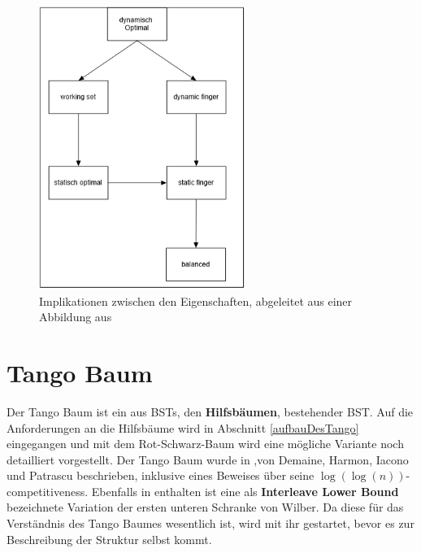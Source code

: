 \documentclass[a4paper,12pt]{article}
\begin{document}
\begin{figure}[h]
	\centering
	\includegraphics[width= 0.6\textwidth]{"Medien/DynOpt/upperBounds"}
	\caption{Implikationen zwischen den Eigenschaften, abgeleitet aus einer Abbildung aus \cite{upperBounds} }
	\label{fig:upperBounds}
\end{figure}


\section{Tango Baum}
Der Tango Baum ist ein aus BSTs, den \textbf{Hilfsbäumen}, bestehender BST. Auf die Anforderungen an die Hilfsbäume wird in Abschnitt \ref{aufbauDesTango} eingegangen und mit dem Rot-Schwarz-Baum wird eine mögliche Variante noch detailliert vorgestellt. Der Tango Baum wurde in \cite{demainDinamicOpti},von Demaine, Harmon, Iacono und Patrascu beschrieben, inklusive eines Beweises über seine $\log\left(\log\left(n\right)\right)$-competitiveness. Ebenfalls in \cite{demainDinamicOpti} enthalten ist eine als \textbf{Interleave Lower Bound} bezeichnete Variation der ersten unteren Schranke von Wilber. Da diese für das Verständnis des Tango Baumes wesentlich ist, wird mit ihr gestartet, bevor es zur Beschreibung der Struktur selbst kommt. 
\end{document}
